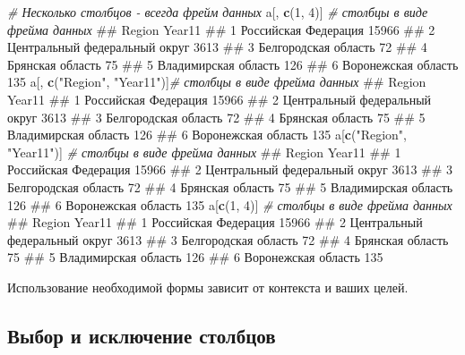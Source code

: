 \documentclass[]{book}
\newenvironment{Shaded}{\begin{snugshade}}{\end{snugshade}}
\newcommand{\KeywordTok}[1]{\textcolor[rgb]{0.13,0.29,0.53}{\textbf{#1}}}
\newcommand{\DecValTok}[1]{\textcolor[rgb]{0.00,0.00,0.81}{#1}}
\newcommand{\StringTok}[1]{\textcolor[rgb]{0.31,0.60,0.02}{#1}}
\newcommand{\CommentTok}[1]{\textcolor[rgb]{0.56,0.35,0.01}{\textit{#1}}}
\newcommand{\NormalTok}[1]{#1}
\begin{document}
\begin{Shaded}
\begin{Highlighting}[]
\CommentTok{# Несколько столбцов - всегда фрейм данных}
\NormalTok{a[, }\KeywordTok{c}\NormalTok{(}\DecValTok{1}\NormalTok{, }\DecValTok{4}\NormalTok{)]              }\CommentTok{# столбцы в виде фрейма данных}
\NormalTok{##                           Region Year11}
\NormalTok{## 1           Российская Федерация  15966}
\NormalTok{## 2 Центральный федеральный округ    3613}
\NormalTok{## 3           Белгородская область     72}
\NormalTok{## 4               Брянская область     75}
\NormalTok{## 5           Владимирская область    126}
\NormalTok{## 6            Воронежская область    135}
\NormalTok{a[, }\KeywordTok{c}\NormalTok{(}\StringTok{"Region"}\NormalTok{, }\StringTok{"Year11"}\NormalTok{)]}\CommentTok{# столбцы в виде фрейма данных}
\NormalTok{##                           Region Year11}
\NormalTok{## 1           Российская Федерация  15966}
\NormalTok{## 2 Центральный федеральный округ    3613}
\NormalTok{## 3           Белгородская область     72}
\NormalTok{## 4               Брянская область     75}
\NormalTok{## 5           Владимирская область    126}
\NormalTok{## 6            Воронежская область    135}
\NormalTok{a[}\KeywordTok{c}\NormalTok{(}\StringTok{"Region"}\NormalTok{, }\StringTok{"Year11"}\NormalTok{)]  }\CommentTok{# столбцы в виде фрейма данных}
\NormalTok{##                           Region Year11}
\NormalTok{## 1           Российская Федерация  15966}
\NormalTok{## 2 Центральный федеральный округ    3613}
\NormalTok{## 3           Белгородская область     72}
\NormalTok{## 4               Брянская область     75}
\NormalTok{## 5           Владимирская область    126}
\NormalTok{## 6            Воронежская область    135}
\NormalTok{a[}\KeywordTok{c}\NormalTok{(}\DecValTok{1}\NormalTok{, }\DecValTok{4}\NormalTok{)]                }\CommentTok{# столбцы в виде фрейма данных}
\NormalTok{##                           Region Year11}
\NormalTok{## 1           Российская Федерация  15966}
\NormalTok{## 2 Центральный федеральный округ    3613}
\NormalTok{## 3           Белгородская область     72}
\NormalTok{## 4               Брянская область     75}
\NormalTok{## 5           Владимирская область    126}
\NormalTok{## 6            Воронежская область    135}
\end{Highlighting}
\end{Shaded}

Использование необходимой формы зависит от контекста и ваших целей.

\subsection{Выбор и исключение столбцов}\label{col_select}
\end{document}
